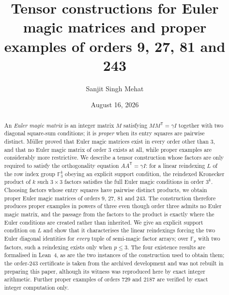 \documentclass[11pt,a4paper]{amsart}
\theoremstyle{plain}
\theoremstyle{definition}
\theoremstyle{remark}
\newcommand{\FF}{\mathbb{F}}
\newcommand{\tr}{\mathsf{T}}
\begin{document}
\title[Tensor constructions for Euler magic matrices]{Tensor constructions for
Euler magic matrices and proper examples of orders 9, 27, 81 and 243}

\author{Sanjit Singh Mehat}

\date{August 16, 2026}


\begin{abstract}
An \emph{Euler magic matrix} is an integer matrix $M$ satisfying
$MM^{\tr}=\gamma I$ together with two diagonal square-sum conditions; it is
\emph{proper} when its entry squares are pairwise distinct. Müller proved that
Euler magic matrices exist in every order other than $3$, and that no Euler
magic matrix of order $3$ exists at all, while proper examples are considerably
more restrictive. We describe a tensor construction whose factors are only
required to satisfy the orthogonality equation $AA^{\tr}=\gamma I$: for a
linear reindexing $L$ of the row index group $\FF_3^k$ obeying an explicit
support condition, the reindexed Kronecker product of $k$ such $3\times3$
factors satisfies the full Euler magic conditions in order $3^k$. Choosing
factors whose entry squares have pairwise distinct products, we obtain proper
Euler magic matrices of orders $9$, $27$, $81$ and $243$. The construction
therefore produces proper examples in powers of three even though order three
admits no Euler magic matrix, and the passage from the factors to the product
is exactly where the Euler conditions are created rather than inherited. We
give an explicit support condition on $L$ and show that it characterises the
linear reindexings forcing the two Euler diagonal identities for \emph{every}
tuple of semi-magic factor arrays; over $\FF_p$ with two factors, such a
reindexing exists only when $p\le3$. The four existence results are formalised
in Lean~4, as are the two instances of the construction used to obtain them;
the order-$243$ certificate is taken from the archived development and was not
rebuilt in preparing this paper, although its witness was reproduced here by
exact integer arithmetic. Further proper examples of orders $729$ and $2187$ are
verified by exact integer computation only.
\end{abstract}

\maketitle
\end{document}
